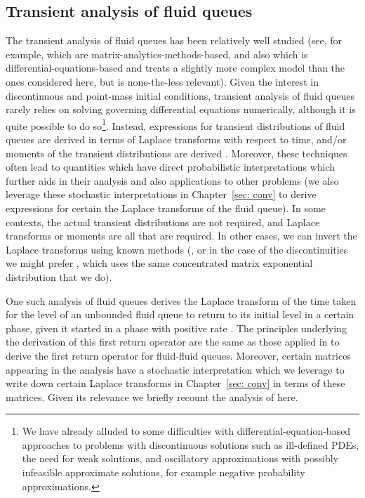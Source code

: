 \subsection{Transient analysis of fluid queues}\label{sec: transient ffq intro}
The transient analysis of fluid queues has been relatively well studied (see, for example, \cite{ar2004,bean2005,dasilva2005,bean2009} which are matrix-analytics-methods-based, and also \cite{rs2003} which is differential-equations-based and treats a slightly more complex model than the ones considered here, but is none-the-less relevant). Given the interest in discontinuous and point-mass initial conditions, transient analysis of fluid queues rarely relies on solving governing differential equations numerically, although it is quite possible to do so\footnote{We have already alluded to some difficulties with differential-equation-based approaches to problems with discontinuous solutions such as ill-defined PDEs, the need for weak solutions, and oscillatory approximations with possibly infeasible approximate solutions, for example negative probability approximations.}. Instead, expressions for transient distributions of fluid queues are derived in terms of Laplace transforms with respect to time, and/or moments of the transient distributions are derived \citep{ar2004,bean2005,bean2009}. Moreover, these techniques often lead to quantities which have direct probabilistic interpretations which further aids in their analysis and also applications to other problems \citep{ar2003,dasilva2005,bnp2018} (we also leverage these stochastic interpretations in Chapter~\ref{sec: conv} to derive expressions for certain the Laplace transforms of the fluid queue). In some contexts, the actual transient distributions are not required, and Laplace transforms or moments are all that are required. In other cases, we can invert the Laplace transforms using known methods (\cite{aw2006}, or in the case of the discontinuities we might prefer \cite{hhat2020}, which uses the same concentrated matrix exponential distribution that we do).

One such analysis of fluid queues derives the Laplace transform of the time taken for the level of an unbounded fluid queue to return to its initial level in a certain phase, given it started in a phase with positive rate \citep{bean2005}. The principles underlying the derivation of this first return operator are the same as those applied in \cite{bo2014} to derive the first return operator for fluid-fluid queues. Moreover, certain matrices appearing in the analysis have a stochastic interpretation which we leverage to write down certain Laplace transforms in Chapter~\ref{sec: conv} in terms of these matrices. Given its relevance we briefly recount the analysis of \cite{bean2005} here. 

